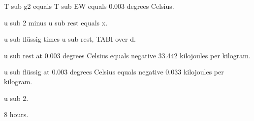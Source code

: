 T sub g2 equals T sub EW equals 0.003 degrees Celsius.

u sub 2 minus u sub rest equals x.

u sub flüssig times u sub rest, TABI over d.

u sub rest at 0.003 degrees Celsius equals negative 33.442 kilojoules per kilogram.

u sub flüssig at 0.003 degrees Celsius equals negative 0.033 kilojoules per kilogram.

u sub 2.

8 hours.